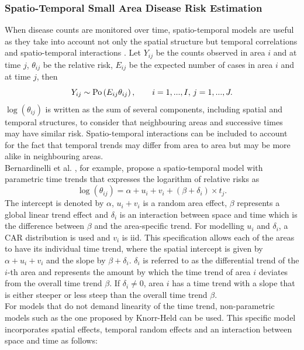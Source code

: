 \subsubsection{Spatio-Temporal Small Area Disease Risk Estimation}\label{sec:spatiotemporal}
When disease counts are monitored over time, spatio-temporal models are useful as they take into account not only the spatial structure but temporal correlations and spatio-temporal interactions \autocite[][]{martinez2008autoregressive}. Let $Y_{ij}$ be the counts observed in area $i$ and at time $j$, $\theta_{ij}$ be the relative risk, $E_{ij}$ be the expected number of cases in area $i$ and at time $j$, then
\begin{equation}
    Y_{ij}\sim\hbox{Po}\left(E_{ij}\theta_{ij}\right), \hspace{20pt} i=1,...,I,\,j=1,...,J.
\end{equation}
$\log\left(\theta_{ij}\right)$ is written as the sum of several components, including spatial and temporal structures, to consider that neighbouring areas and successive times may have similar risk. Spatio-temporal interactions can be included to account for the fact that temporal trends may differ from area to area but may be more alike in neighbouring areas. \\
Bernardinelli et al. \autocite[][]{bernardinelli1995bayesian}, for example, propose a spatio-temporal model with parametric time trends that expresses the logarithm of relative risks as
\begin{equation}
    \log\left(\theta_{ij}\right)=\alpha+u_i+v_i+ \left(\beta+\delta_i\right)\times t_j.
\end{equation}
The intercept is denoted by $\alpha$, $u_i+v_i$ is a random area effect, $\beta$ represents a global linear trend effect and $\delta_i$ is an interaction between space and time which is the difference between $\beta$ and the area-specific trend. For modelling $u_i$ and $\delta_i$, a CAR distribution is used and $v_i$ is iid. This specification allows each of the areas to have its individual time trend, where the spatial intercept is given by $\alpha+u_i+v_i$ and the slope by $\beta+\delta_i$. $\delta_i$ is referred to as the differential trend of the $i$-th area and represents the amount by which the time trend of area $i$ deviates from the overall time trend $\beta$. If $\delta_i\neq 0$, area $i$ has a time trend with a slope that is either steeper or less steep than the overall time trend $\beta$. \\
For models that do not demand linearity of the time trend, non-parametric models such as the one proposed by Knorr-Held \autocite[][]{knorr2000bayesian} can be used. This specific model incorporates spatial effects, temporal random effects and an interaction between space and time as follows:
